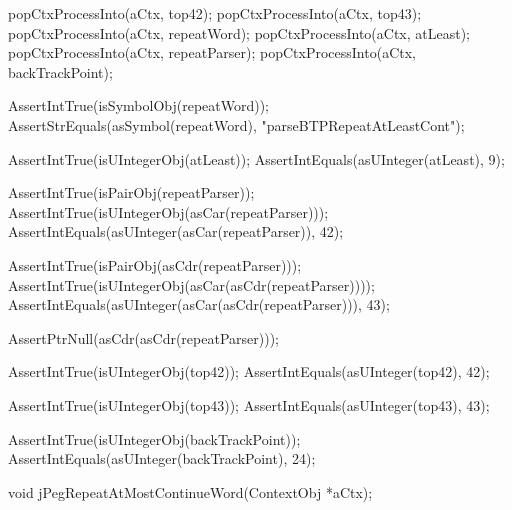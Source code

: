   popCtxProcessInto(aCtx, top42);
  popCtxProcessInto(aCtx, top43);
  popCtxProcessInto(aCtx, repeatWord);
  popCtxProcessInto(aCtx, atLeast);
  popCtxProcessInto(aCtx, repeatParser);
  popCtxProcessInto(aCtx, backTrackPoint);
  
  AssertIntTrue(isSymbolObj(repeatWord));
  AssertStrEquals(asSymbol(repeatWord), "parseBTPRepeatAtLeastCont");
  
  AssertIntTrue(isUIntegerObj(atLeast));
  AssertIntEquals(asUInteger(atLeast), 9);
  
  AssertIntTrue(isPairObj(repeatParser));
  AssertIntTrue(isUIntegerObj(asCar(repeatParser)));
  AssertIntEquals(asUInteger(asCar(repeatParser)), 42);
  
  AssertIntTrue(isPairObj(asCdr(repeatParser)));
  AssertIntTrue(isUIntegerObj(asCar(asCdr(repeatParser))));
  AssertIntEquals(asUInteger(asCar(asCdr(repeatParser))), 43);
  
  AssertPtrNull(asCdr(asCdr(repeatParser)));
  
  AssertIntTrue(isUIntegerObj(top42));
  AssertIntEquals(asUInteger(top42), 42);  

  AssertIntTrue(isUIntegerObj(top43));
  AssertIntEquals(asUInteger(top43), 43);
  
  AssertIntTrue(isUIntegerObj(backTrackPoint));
  AssertIntEquals(asUInteger(backTrackPoint), 24);
\stopCTest
\stopTestCase
\stopTestSuite

\startTestSuite[jPegRepeatAtMostContinueWord]

\startCHeader
void jPegRepeatAtMostContinueWord(ContextObj *aCtx);
\stopCHeader

